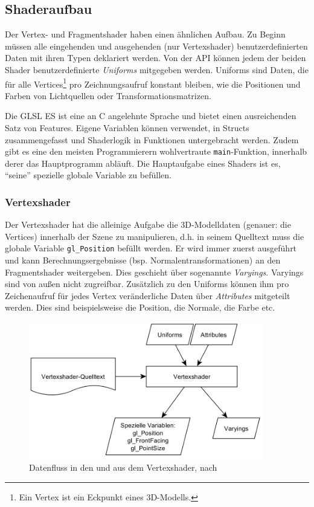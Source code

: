 \subsection{Shaderaufbau}
Der Vertex- und Fragmentshader haben einen ähnlichen Aufbau. Zu Beginn müssen alle eingehenden und ausgehenden (nur Vertexshader) benutzerdefinierten Daten mit ihren Typen deklariert werden. Von der API können jedem der beiden Shader benutzerdefinierte \textit{Uniforms} mitgegeben werden. Uniforms sind Daten, die für alle Vertices\footnote{Ein Vertex ist ein Eckpunkt eines 3D-Modells.} pro Zeichnungsaufruf konstant bleiben, wie die Positionen und Farben von Lichtquellen oder Transformationsmatrizen.

Die GLSL ES ist eine an C angelehnte Sprache und bietet einen ausreichenden Satz von Features. Eigene Variablen können verwendet, in Structs zusammengefasst und Shaderlogik in Funktionen untergebracht werden. Zudem gibt es eine den meisten Programmierern wohlvertraute \texttt{main}-Funktion, innerhalb derer das Hauptprogramm abläuft. Die Hauptaufgabe eines Shaders ist es, "`seine"' spezielle globale Variable zu befüllen.

\subsubsection{Vertexshader}
Der Vertexshader hat die alleinige Aufgabe die 3D-Modelldaten (genauer: die Vertices) innerhalb der Szene zu manipulieren, d.h. in seinem Quelltext muss die globale Variable \texttt{gl\_Position} befüllt werden. Er wird immer zuerst ausgeführt und kann Berechnungsergebnisse (bsp. Normalentransformationen) an den Fragmentshader weitergeben. Dies geschieht über sogenannte \textit{Varyings}. Varyings sind von außen nicht zugreifbar. Zusätzlich zu den Uniforms können ihm pro Zeichenaufruf für jedes Vertex veränderliche Daten über \textit{Attributes} mitgeteilt werden. Dies sind beispielsweise die Position, die Normale, die Farbe etc.
\begin{figure}
\centering
\includegraphics[height=60mm]{bilder/vertexshader.png}
\caption{Datenfluss in den und aus dem Vertexshader, nach \autocite{WebGlPogramming}}
\label{fig:vertexshader}
\end{figure}

